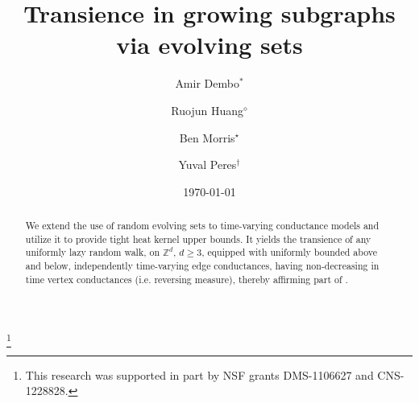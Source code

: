 \documentclass[12pt,reqno]{amsart}
\numberwithin{equation}{section}
\theoremstyle{definition}
\begin{document}
\title[Transience in growing subgraphs via evolving sets
 ]
{Transience in growing subgraphs via evolving sets
}
\date{\today}

\author[A.\ Dembo]{Amir Dembo$^*$}
\author[R.\ Huang]{Ruojun Huang$^\diamond$}
\author[B.\ Morris]{Ben Morris$^\star$}
\author[Y.\ Peres]{Yuval Peres$^\dagger$}
\address{$^*$Department of Mathematics, Stanford University, Building 380, 
Sloan Hall, Stanford, CA 94305, USA}
\address{$^{*\diamond}$Department of Statistics, Stanford University,
 Sequoia Hall, 390 Serra Mall, Stanford, CA 94305, USA}
\address{$^\star$ Department of Mathematics, University of California at Davis, One Shields Ave, Davis, CA 95616, USA}
\address{$^\dagger$ Theory Group, Microsoft Research, One Microsoft Way,
Redmond, WA 98052, USA}

\thanks{This research was supported in part by NSF grants DMS-1106627
and CNS-1228828.}



\maketitle
\begin{abstract}
We extend the use of 
random evolving sets to time-varying conductance models and utilize 
it to provide tight heat kernel upper bounds. It yields the transience of 
any uniformly lazy random walk, on ${\mathbb{Z}}^d$, $d\ge3$, equipped 
with uniformly bounded above and below, independently time-varying 
edge conductances, having non-decreasing in time 
vertex conductances (i.e. reversing measure), 
thereby affirming part of \cite[Conj. 7.1]{ABGK}.
\end{abstract}
\end{document}
